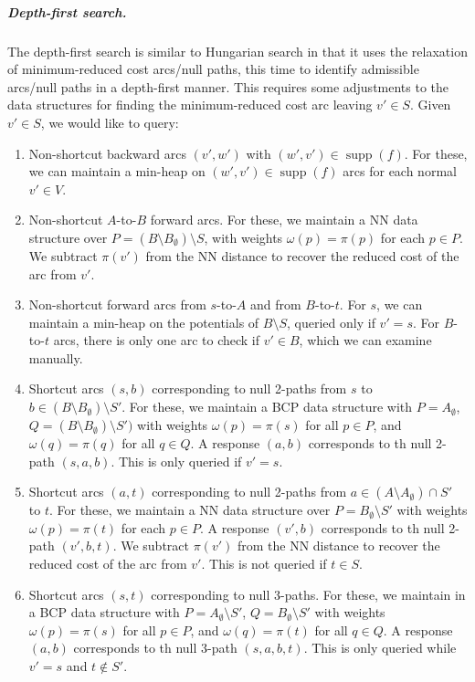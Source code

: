 \documentclass[a4paper,UKenglish]{socg-lipics-v2018}
\def\supp{\operatorname{supp}}
\theoremstyle{plain}
\numberwithin{figure}{section}
\renewcommand{\paragraph}{\subparagraph}
\begin{document}
\paragraph{Depth-first search.}

The depth-first search is similar to Hungarian search in that it
uses the relaxation of minimum-reduced cost arcs/null paths, this time to
identify admissible arcs/null paths in a depth-first manner.
This requires some adjustments to the data structures for finding the
minimum-reduced cost arc leaving $v' \in S$.
Given $v' \in S$, we would like to query:
%

\begin{toappendix}

\begin{enumerate}
\item Non-shortcut backward arcs $(v', w')$ with $(w', v') \in \supp(f)$.
	For these, we can maintain a min-heap on $(w', v') \in \supp(f)$ arcs
	for each normal $v' \in V$.
\item Non-shortcut $A$-to-$B$ forward arcs.
	For these, we maintain a NN data structure over
	$P = (B \setminus B_\emptyset) \setminus S$, with weights
	$\omega(p) = \pi(p)$ for each $p \in P$.
	We subtract $\pi(v')$ from the NN distance to recover the reduced cost
	of the arc from $v'$.
\item Non-shortcut forward arcs from $s$-to-$A$ and from $B$-to-$t$.
	For $s$, we can maintain a min-heap on the potentials of
	$B \setminus S$, queried only if $v' = s$.
	For $B$-to-$t$ arcs, there is only one arc to check if $v' \in B$,
	which we can examine manually.

\item Shortcut arcs $(s, b)$ corresponding to null 2-paths from $s$ to
	$b \in (B \setminus B_\emptyset) \setminus S'$.
	For these, we maintain a BCP data structure with $P = A_\emptyset$,
	$Q = (B \setminus B_\emptyset) \setminus S')$ with weights
	$\omega(p) = \pi(s)$ for all $p \in P$, and $\omega(q) = \pi(q)$ for
	all $q \in Q$.
	A response $(a, b)$ corresponds to th null 2-path $(s, a, b)$.
	This is only queried if $v' = s$.
\item Shortcut arcs $(a, t)$ corresponding to null 2-paths from
	$a \in (A \setminus A_\emptyset) \cap S'$ to $t$.
	For these, we maintain a NN data structure over
	$P = B_\emptyset \setminus S'$ with weights $\omega(p) = \pi(t)$ for
	each $p \in P$.
	A response $(v', b)$ corresponds to th null 2-path $(v', b, t)$.
	We subtract $\pi(v')$ from the NN distance to recover the reduced cost
	of the arc from $v'$.
	This is not queried if $t \in S$.
\item Shortcut arcs $(s, t)$ corresponding to null 3-paths.
	For these, we maintain in a BCP data structure with
	$P = A_\emptyset \setminus S'$, $Q = B_\emptyset \setminus S'$ with
	weights $\omega(p) = \pi(s)$ for all
	$p \in P$, and $\omega(q) = \pi(t)$ for all $q \in Q$.
	A response $(a, b)$ corresponds to th null 3-path $(s, a, b, t)$.
	This is only queried while $v' = s$ and $t \not\in S'$.
\end{enumerate}

\end{toappendix}
\end{document}
